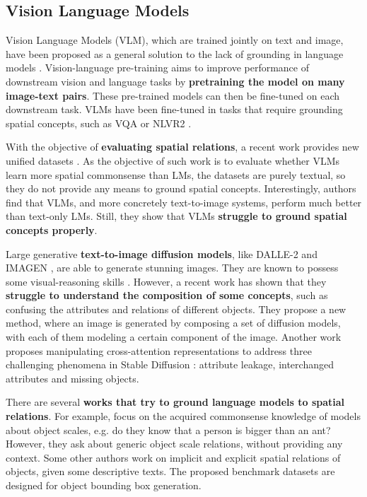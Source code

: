 \subsection{Vision Language Models} \label{sec:vision_language_models}

Vision Language Models (VLM), which are trained jointly on text and image, have been proposed as a general solution to the lack of grounding in language models \cite{lu2019vilbert, tan2020lxmert, ramesh2022hierarchical, saharia2022photorealistic}. Vision-language pre-training aims to improve performance of downstream vision and language tasks by \textbf{pretraining the model on many image-text pairs}. These pre-trained models can then be fine-tuned on each downstream task. VLMs have been fine-tuned in tasks that require grounding spatial concepts, such as VQA \cite{antol2015vqa} or NLVR2 \cite{suhr2018corpus}.

With the objective of \textbf{evaluating spatial relations}, a recent work provides new unified datasets \cite{liu2022things}. As the objective of such work is to evaluate whether VLMs learn more spatial commonsense than LMs, the datasets are purely textual, so they do not provide any means to ground spatial concepts. Interestingly, authors find that VLMs, and more concretely text-to-image systems, perform much better than text-only LMs. Still, they show that VLMs \textbf{struggle to ground spatial concepts properly}.

Large generative \textbf{text-to-image diffusion models}, like DALLE-2 \cite{ramesh2022hierarchical} and IMAGEN \cite{saharia2022photorealistic}, are able to generate stunning images. They are known to possess some visual-reasoning skills \cite{cho2022dall}. However, a recent work \cite{liu2022compositional} has shown that they \textbf{struggle to understand the composition of some concepts}, such as confusing the attributes and relations of different objects. They propose a new method, where an image is generated by composing a set of diffusion models, with each of them modeling a certain component of the image. Another work \cite{anonymous2023trainingfree} proposes manipulating cross-attention representations to address three challenging phenomena in Stable Diffusion \cite{rombach2021highresolution}: attribute leakage, interchanged attributes and missing objects.

There are several \textbf{works that try to ground language models to spatial relations}. For example, \cite{bagherinezhad2016elephants, elazar2019large} focus on the acquired commonsense knowledge of models about object scales, e.g. do they know that a person is bigger than an ant? However, they ask about generic object scale relations, without providing any context. Some other authors \cite{collell2018acquiring, elu2021inferring} work on implicit and explicit spatial relations of objects, given some descriptive texts. The proposed benchmark datasets are designed for object bounding box generation.

